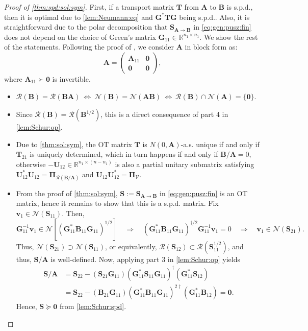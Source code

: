 \documentclass[noinfoline]{imsart}\setcounter{tocdepth}{2}
\renewcommand{\b}[1]{\mathbb{#1}} %
\newcommand{\m}[1]{\mathbf{#1}} %
\renewcommand{\c}[1]{\mathcal{#1}} %
\theoremstyle{plain}
\begin{document}
\begin{proof}[Proof of \cref{thm:spd:sol:sym}]
First, if a transport matrix $\m{T}$ from $\m{A}$ to $\m{B}$ is s.p.d., then it is optimal due to \cref{lem:Neumann:eq} and $\m{G}^{*} \m{T} \m{G}$ being s.p.d.. Also, it is straightforward due to the polar decomposition that $\m{S}_{\m{A} \to \m{B}}$ in \eqref{eq:gen:pusz:fin} does not depend on the choice of Green's matrix $\m{G}_{11} \in \b{R}^{n_{1} \times n_{1}}$. We show the rest of the statements. Following the proof of , we consider $\m{A}$ in block form as:
\begin{equation*}
    \m{A} = \begin{pmatrix}
    \m{A}_{11} & \m{0} \\
    \m{0} & \m{0}
    \end{pmatrix},
\end{equation*}
where $\m{A}_{11} \succ \m{0}$ is invertible.

\begin{itemize}[leftmargin=*]
\item [($4 \Leftrightarrow 5)$] $\c{R} (\m{B}) = \c{R}(\m{B} \m{A}) \ \Leftrightarrow \ \c{N} (\m{B}) = \c{N}(\m{A} \m{B}) \ \Leftrightarrow \ \c{R}(\m{B}) \cap \c{N}(\m{A}) = \{ \m{0} \}$.
\item [($3 \Leftrightarrow 5)$] Since $\c{R}(\m{B}) = \c{R}(\m{B}^{1/2})$, this is a direct consequence of part 4 in \cref{lem:Schur:op}.
\item [($2 \Leftrightarrow 3)$] Due to \cref{thm:sol:sym}, the OT matrix $\m{T}$ is $N(0, \m{A})$-a.s. unique if and only if $\m{T}_{21}$ is uniquely determined, which in turn happens if and only if $\m{B}/\m{A} = 0$, otherwise $-\m{U}_{12} \in \b{R}^{n_{1} \times (n-n_{1})}$ is also a partial unitary submatrix satisfying $\m{U}_{12}^{*} \m{U}_{12} = \m{\Pi}_{\c{R}(\m{B}/\m{A})}$ and $\m{U}_{12} \m{U}_{12}^{*} = \m{\Pi}_{\mathcal{V}}$.

\item [($3 \Rightarrow 1)$] From the proof of \cref{thm:sol:sym}, $\m{S} := \m{S}_{\m{A} \to \m{B}}$ in \eqref{eq:gen:pusz:fin} is an OT matrix, hence it remains to show that this is a s.p.d. matrix. Fix $\m{v}_{1} \in \c{N}(\m{S}_{11})$. Then,
\begin{equation*}
    \m{G}_{11}^{-1} \m{v}_{1} \in \c{N}[(\m{G}_{11}^{*} \m{B}_{11} \m{G}_{11})^{1/2}] \quad \Rightarrow \quad (\m{G}_{11}^{*} \m{B}_{11} \m{G}_{11})^{\dagger/2} \m{G}_{11}^{-1} \m{v}_{1} = 0 \quad \Rightarrow \quad \m{v}_{1} \in \c{N}(\m{S}_{21}).
\end{equation*}
Thus, $\c{N}(\m{S}_{21}) \supset \c{N}(\m{S}_{11})$, or equivalently, $\c{R}(\m{S}_{12}) \subset \c{R}(\m{S}_{11}^{1/2})$, and thus, $\m{S}/\m{A}$ is well-defined. Now, applying part 3 in \cref{lem:Schur:op} yields
\begin{align*}
    \m{S}/\m{A} &= \m{S}_{22} - (\m{S}_{21} \m{G}_{11}) (\m{G}_{11}^{*} \m{S}_{11} \m{G}_{11})^{\dagger} (\m{G}_{11}^{*} \m{S}_{12}) \\
    &= \m{S}_{22} - (\m{B}_{21} \m{G}_{11}) (\m{G}_{11}^{*} \m{B}_{11} \m{G}_{11})^{2\dagger} (\m{G}_{11}^{*} \m{B}_{12}) = \m{0}.
\end{align*}
Hence, $\m{S} \succeq \m{0}$ from \cref{lem:Schur:spd}.


\end{itemize}
\end{proof}
\end{document}
